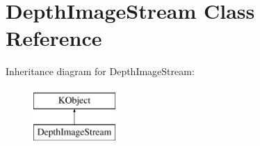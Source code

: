 \hypertarget{class_depth_image_stream}{\section{\-Depth\-Image\-Stream \-Class \-Reference}
\label{class_depth_image_stream}
}
\-Inheritance diagram for \-Depth\-Image\-Stream\-:\begin{figure}[H]
\begin{center}
\leavevmode
\includegraphics[height=2.000000cm]{class_depth_image_stream}
\end{center}
\end{figure}
